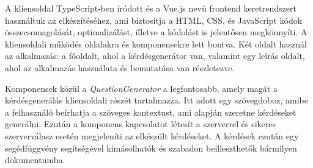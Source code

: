 
A kliensoldal TypeScript-ben íródott és a Vue.js nevű frontend keretrendszert használtuk az elkészítéséhez, ami biztosítja a HTML, CSS, és JavaScript kódok összecsomagolását, optimalizálást, illetve a kódolást is jelentősen megkönnyíti. A kliensoldali működés oldalakra és komponensekre lett bontva. Két oldalt használ az alkalmazás: a főoldalt, ahol a kérdésgenerátor van, valamint egy leírás oldalt, ahol az alkalmazás használata és bemutatása van részletezve.

Komponensek közül a \textit{QuestionGenerator} a legfontosabb, amely magát a kérdésgenerálás kliensoldali részét tartalmazza. Itt adott egy szövegdoboz, amibe a felhasználó beírhatja a szöveges kontextust, ami alapján szeretne kérdéseket generálni. Ezután a komponens kapcsolatot létesít a szerverrel és sikeres szerverválasz esetén megjeleníti az elkészült kérdéseket. A kérdések ezután egy segédfüggvény segítségével kimásolhatók és szabadon beilleszthetők bármilyen dokumentumba.